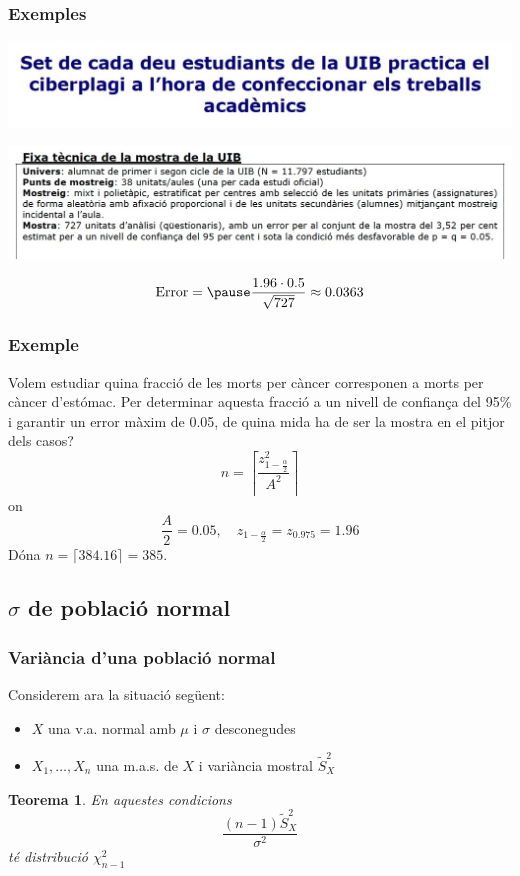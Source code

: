 \documentclass[12pt,t]{beamer}
\renewcommand{\emph}[1]{{\color{red}#1}}
\theoremstyle{plain}
\newtheorem{teorema}{Teorema}
\theoremstyle{definition}
\begin{document}
\begin{frame}
\frametitle{Exemples}

\begin{center}
\hspace*{-0.5cm}
\includegraphics[width=1.1\linewidth]{plagiUIB1.jpg}\bigskip

\hspace*{-0.5cm}\includegraphics[width=1.1\linewidth]{plagiUIB2.jpg}
\end{center}
$$
\mbox{Error}=\pause \frac{1.96\cdot 0.5}{\sqrt{727}}\approx 0.0363
$$
\end{frame}



\begin{frame}
\frametitle{Exemple}
Volem estudiar quina fracció de les morts per càncer corresponen a morts per càncer d'estómac. Per determinar aquesta fracció a un nivell de confiança del 95\% i garantir un error màxim de 0.05, de quina mida ha de ser la mostra \emph{en el pitjor dels casos}?
$$
n=\left\lceil\frac{z_{1-\frac{\alpha}{2}}^2}{A^2}\right\rceil
$$
on
$$
\frac{A}{2}=0.05,\quad z_{1-\frac{\alpha}{2}}=z_{0.975}=1.96
$$
Dóna $n= \lceil 384.16\rceil=385$.

\end{frame}




\subsection{$\sigma$ de població normal}
\begin{frame}
\frametitle{Variància d'una població normal}


Considerem ara la situació següent:
\begin{itemize}
\item  $X$ una v.a. normal amb $\mu$ i $\sigma$ desconegudes

\item $X_1,\ldots,X_n$ una m.a.s. de $X$ i variància mostral $\widetilde{S}_X^2$
\end{itemize}


\begin{teorema}
En aquestes condicions
$$
\frac{(n-1) \tilde{S}_{X}^2}{\sigma^2}
$$
té distribució $\chi^2_{n-1}$
\end{teorema}
\end{frame}
\end{document}
